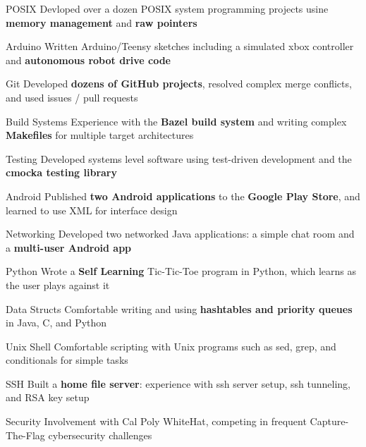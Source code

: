\begin{cvskills}

 \cvskill
    {POSIX} %
    {Devloped over a dozen POSIX system programming projects usine \textbf{memory management} and \textbf{raw pointers}}%

 \cvskill
    {Arduino} %
    {Written Arduino/Teensy sketches including a simulated xbox controller and \textbf{autonomous robot drive code}} %

 \cvskill
    {Git} %
    {Developed \textbf{dozens of GitHub projects}, resolved complex merge conflicts, and used issues / pull requests} %

 \cvskill
    {Build Systems} %
    {Experience with the \textbf{Bazel build system} and writing complex \textbf{Makefiles} for multiple target architectures} %

 \cvskill
    {Testing} %
    {Developed systems level software using test-driven development and the \textbf{cmocka testing library}} %
    
 \cvskill
    {Android} %
    {Published \textbf{two Android applications} to the \textbf{Google Play Store}, and learned to use XML for interface design} %

 \cvskill
    {Networking} %
    {Developed two networked Java applications: a simple chat room and a \textbf{multi-user Android app}} %
 
 \cvskill
    {Python} %
    {Wrote a \textbf{Self Learning} Tic-Tic-Toe program in Python, which learns as the user plays against it} %

 \cvskill
    {Data Structs} %
    {Comfortable writing and using \textbf{hashtables and priority queues} in Java, C, and Python} %

 \cvskill
    {Unix Shell} %
    {Comfortable scripting with Unix programs such as sed, grep, and conditionals for simple tasks} %

 \cvskill
    {SSH} %
    {Built a \textbf{home file server}: experience with ssh server setup, ssh tunneling, and RSA key setup} %

 \cvskill
    {Security} %
    {Involvement with Cal Poly WhiteHat, competing in frequent Capture-The-Flag cybersecurity challenges} %


\end{cvskills}

